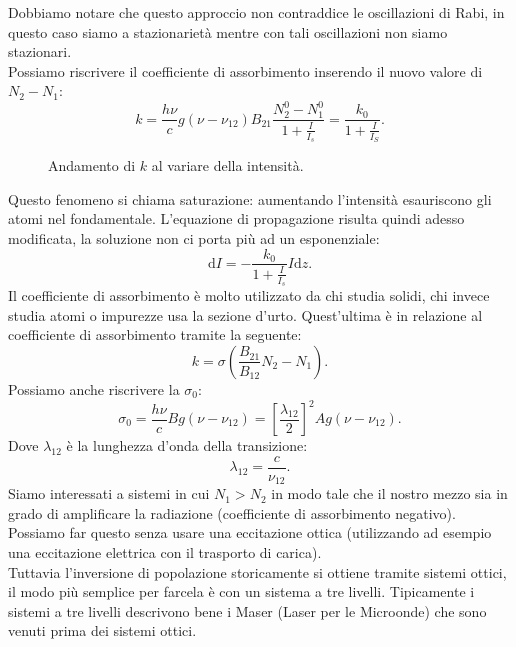 Dobbiamo notare che questo approccio non contraddice le oscillazioni di Rabi, in questo caso siamo a stazionarietà mentre con tali oscillazioni non siamo stazionari. \\
Possiamo riscrivere il coefficiente di assorbimento inserendo il nuovo valore di $N_2-N_1$:
\[
    k= \frac{h\nu}{c}g(\nu-\nu_{12})B_{21} \frac{N_2^0-N_1^0}{1+\frac{I}{I_s}}=
    \frac{k_0}{1+\frac{I}{I_S}}
.\]
\begin{figure}[H]
    \centering
    \caption{Andamento di $k$ al variare della intensità.}
    \label{Andamento di k0 al variare della intensità.}
\end{figure}
\noindent
Questo fenomeno si chiama saturazione: aumentando l'intensità esauriscono gli atomi nel fondamentale. L'equazione di propagazione risulta quindi adesso modificata, la soluzione non ci porta più ad un esponenziale:
\[
    \text{d}I=-\frac{k_0}{1+\frac{I}{I_s}}I \text{d}z
.\] 
Il coefficiente di assorbimento è molto utilizzato da chi studia solidi, chi invece studia atomi o impurezze usa la sezione d'urto. Quest'ultima è in relazione al coefficiente di assorbimento tramite la seguente:
\[
    k = \sigma\left(\frac{B_{21}}{B_{12}}N_2-N_1\right)
.\] 
Possiamo anche riscrivere la $\sigma_0$:
\[
    \sigma_0=\frac{h\nu}{c}Bg(\nu-\nu_{12}) =
    \left[\frac{\lambda_{12}}{2}\right]^2Ag(\nu-\nu_{12}) 
.\] 
Dove $\lambda_{12}$ è la lunghezza d'onda della transizione: 
\[
    \lambda_{12} = \frac{c}{\nu_{12}}
.\] 
Siamo interessati a sistemi in cui $N_1>N_2$ in modo tale che il nostro mezzo sia in grado di amplificare la radiazione (coefficiente di assorbimento negativo). Possiamo far questo senza usare una eccitazione ottica (utilizzando ad esempio una eccitazione elettrica con il trasporto di carica).\\
Tuttavia l'inversione di popolazione storicamente si ottiene tramite sistemi ottici, il modo più semplice per farcela è con un sistema a tre livelli. Tipicamente i sistemi a tre livelli descrivono bene i Maser (Laser per le Microonde) che sono venuti prima dei sistemi ottici.
